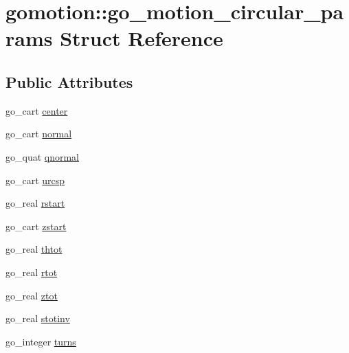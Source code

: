 \hypertarget{structgomotion_1_1go__motion__circular__params}{\section{gomotion\-:\-:go\-\_\-motion\-\_\-circular\-\_\-params Struct Reference}
\label{structgomotion_1_1go__motion__circular__params}
}
\subsection*{Public Attributes}
\begin{DoxyCompactItemize}
\item 
go\-\_\-cart \hyperlink{structgomotion_1_1go__motion__circular__params_afcf8dda6a72f29ce49a61130adbf3971}{center}
\item 
go\-\_\-cart \hyperlink{structgomotion_1_1go__motion__circular__params_af933e19d1dba3641d570a3aa42b9969b}{normal}
\item 
go\-\_\-quat \hyperlink{structgomotion_1_1go__motion__circular__params_abd5283624621e9fb218671e9996eb3c3}{qnormal}
\item 
go\-\_\-cart \hyperlink{structgomotion_1_1go__motion__circular__params_ab97f8ccebf3ca78e2be4a4adfe9c9e8c}{urcsp}
\item 
go\-\_\-real \hyperlink{structgomotion_1_1go__motion__circular__params_aeee40430ac2667fef1fc6eba842427b7}{rstart}
\item 
go\-\_\-cart \hyperlink{structgomotion_1_1go__motion__circular__params_a3638d197aac3d27862052befae408e94}{zstart}
\item 
go\-\_\-real \hyperlink{structgomotion_1_1go__motion__circular__params_a03f65f0ef19c2d9e83d05de75fe9fd3f}{thtot}
\item 
go\-\_\-real \hyperlink{structgomotion_1_1go__motion__circular__params_a576992f878d73c0771e072fe37438f4f}{rtot}
\item 
go\-\_\-real \hyperlink{structgomotion_1_1go__motion__circular__params_a1572625c5322b3ace560429703948191}{ztot}
\item 
go\-\_\-real \hyperlink{structgomotion_1_1go__motion__circular__params_a4436b498d123ce3776166eb75e8efcd5}{stotinv}
\item 
go\-\_\-integer \hyperlink{structgomotion_1_1go__motion__circular__params_a2d8430003302e61cb95c2a0c75e60037}{turns}
\end{DoxyCompactItemize}


